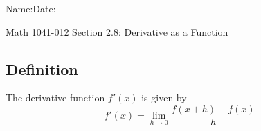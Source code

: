 \documentclass[10pt]{book}
\theoremstyle{definition}
\begin{document}
\begin{flushleft}
Name:\underline{\hspace{13cm}}Date:\underline{\hspace{2cm}}
\end{flushleft}
\begin{center}
{\Large Math 1041-012 \hspace{0.5cm} Section 2.8: Derivative as a Function}
\end{center}
\begin{tcolorbox}
\subsection*{Definition}
The derivative function $f'(x)$ is given by
\[
f'(x)=\lim_{h\rightarrow 0}\frac{f(x+h)-f(x)}{h}
\]
\end{tcolorbox}
\end{document}
